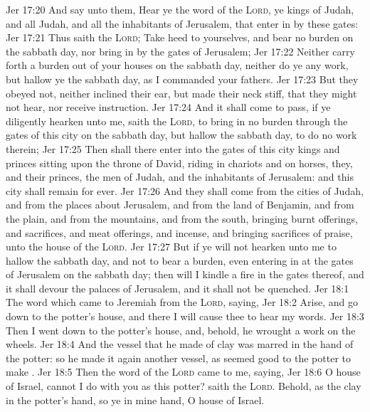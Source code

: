 \vs Jer 17:20 And say unto them, Hear ye the word of the \textsc{Lord}, ye kings of Judah, and all Judah, and all the inhabitants of Jerusalem, that enter in by these gates:
\vs Jer 17:21 Thus saith the \textsc{Lord}; Take heed to yourselves, and bear no burden on the sabbath day, nor bring  in by the gates of Jerusalem;
\vs Jer 17:22 Neither carry forth a burden out of your houses on the sabbath day, neither do ye any work, but hallow ye the sabbath day, as I commanded your fathers.
\vs Jer 17:23 But they obeyed not, neither inclined their ear, but made their neck stiff, that they might not hear, nor receive instruction.
\vs Jer 17:24 And it shall come to pass, if ye diligently hearken unto me, saith the \textsc{Lord}, to bring in no burden through the gates of this city on the sabbath day, but hallow the sabbath day, to do no work therein;
\vs Jer 17:25 Then shall there enter into the gates of this city kings and princes sitting upon the throne of David, riding in chariots and on horses, they, and their princes, the men of Judah, and the inhabitants of Jerusalem: and this city shall remain for ever.
\vs Jer 17:26 And they shall come from the cities of Judah, and from the places about Jerusalem, and from the land of Benjamin, and from the plain, and from the mountains, and from the south, bringing burnt offerings, and sacrifices, and meat offerings, and incense, and bringing sacrifices of praise, unto the house of the \textsc{Lord}.
\vs Jer 17:27 But if ye will not hearken unto me to hallow the sabbath day, and not to bear a burden, even entering in at the gates of Jerusalem on the sabbath day; then will I kindle a fire in the gates thereof, and it shall devour the palaces of Jerusalem, and it shall not be quenched.
\vs Jer 18:1 The word which came to Jeremiah from the \textsc{Lord}, saying,
\vs Jer 18:2 Arise, and go down to the potter's house, and there I will cause thee to hear my words.
\vs Jer 18:3 Then I went down to the potter's house, and, behold, he wrought a work on the wheels.
\vs Jer 18:4 And the vessel that he made of clay was marred in the hand of the potter: so he made it again another vessel, as seemed good to the potter to make .
\vs Jer 18:5 Then the word of the \textsc{Lord} came to me, saying,
\vs Jer 18:6 O house of Israel, cannot I do with you as this potter? saith the \textsc{Lord}. Behold, as the clay  in the potter's hand, so  ye in mine hand, O house of Israel.
